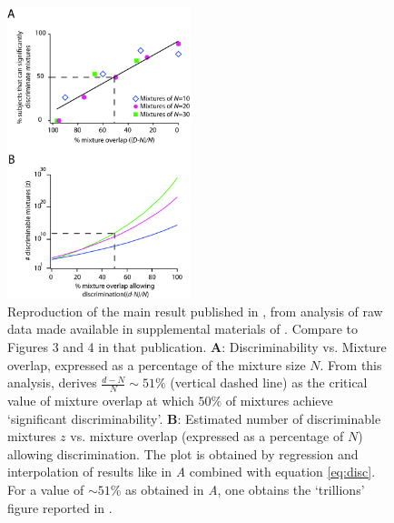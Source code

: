 \documentclass[letterpaper,twocolumn,10pt]{article}
\begin{document}
\begin{figure}[!hbt]
    \centering
    \includegraphics[width=0.475\textwidth]{figures/Fig2_Reconstruction}
    \caption{
Reproduction of the main result published in \cite{bushdid_humans_2014}, 
from analysis of raw data made available in supplemental materials of \cite{bushdid_humans_2014}. Compare to Figures 3 and 4 in that publication. 
\textbf{A}: Discriminability vs. Mixture overlap, expressed as a percentage of the mixture size $N$. 
From this analysis, \cite{bushdid_humans_2014} derives $\frac{d-N}{N}\sim51\%$ (vertical dashed line) as the critical value of mixture overlap at which $50\%$ of mixtures achieve `significant discriminability'. 
\textbf{B}: Estimated number of discriminable mixtures $z$ vs. mixture overlap (expressed as a percentage of $N$) allowing discrimination. 
The plot is obtained by regression and interpolation of results like in \textit{A} combined with equation \ref{eq:disc}. 
For a value of $\sim51\%$ as obtained in \textit{A}, 
one obtains the `trillions' figure reported in \cite{bushdid_humans_2014}.}
    \label{fig:reconstruction}
\end{figure}
\end{document}
